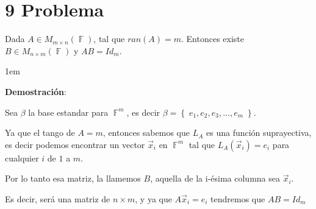 \documentclass[12pt, fleqn]{article}                             %
\newenvironment{SmallIndentation}[1][0.75em]                    %
        {\begin{adjustwidth}{#1}{}\begin{footnotesize}}             %
        {\end{footnotesize}\end{adjustwidth}}                       %
\theoremstyle{break}                                            %
\DeclareMathOperator \GenericField {\mathbb{F}}                 %
\newcommand{\Set}[1]    {\left\{ \; #1 \; \right\}}             %
\begin{document}
\section{9 Problema}

    Dada $A \in M_{m \times n}(\GenericField)$, tal que $ran(A) = m$. Entonces existe 
    $B \in M_{n \times m}(\GenericField)$ y $AB = Id_m$.

    \begin{SmallIndentation}[1em]
        \textbf{Demostración}:
        

        Sea $\beta$ la base estandar para $\GenericField^m$, es decir
        $\beta = \Set{e_1, e_2, e_3, \dots, e_m}$.

        Ya que el tango de $A = m$, entonces sabemos que $L_A$ es una función suprayectiva,
        es decir podemos encontrar un vector $\vec x_i$ en $\GenericField^m$ tal que $L_A(\vec x_i) = e_i$
        para cualquier $i$ de $1$ a $m$.

        Por lo tanto esa matriz, la llamemos $B$, aquella de la i-ésima columna sea $\vec x_i$.

        Es decir, será una matriz de $n \times m$, y ya que $A \vec x_i = e_i$ tendremos que $AB = Id_m$
    
    \end{SmallIndentation}
\end{document}
